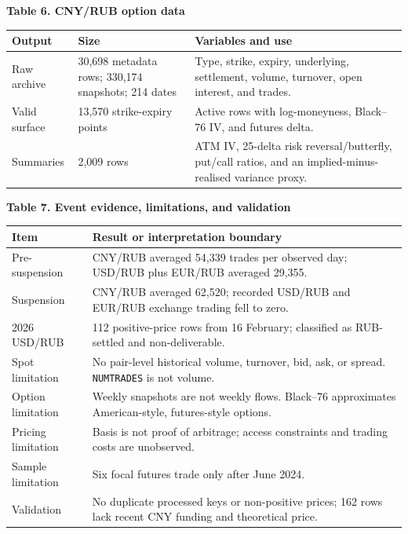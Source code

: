 \documentclass[11pt,a4paper]{article}
\begin{document}
\textbf{Table 6. CNY/RUB option data}

\begin{tabularx}{\textwidth}{@{}p{}p{}Y@{}}
\toprule
\textbf{Output} & \textbf{Size} & \textbf{Variables and use} \\
\midrule
Raw archive & 30,698 metadata rows; 330,174 snapshots; 214 dates & Type, strike, expiry, underlying, settlement, volume, turnover, open interest, and trades. \\
Valid surface & 13,570 strike-expiry points & Active rows with log-moneyness, Black--76 IV, and futures delta. \\
Summaries & 2,009 rows & ATM IV, 25-delta risk reversal/butterfly, put/call ratios, and an implied-minus-realised variance proxy. \\
\bottomrule
\end{tabularx}

\textbf{Table 7. Event evidence, limitations, and validation}

\begin{tabularx}{\textwidth}{@{}p{}Y@{}}
\toprule
\textbf{Item} & \textbf{Result or interpretation boundary} \\
\midrule
Pre-suspension & CNY/RUB averaged 54,339 trades per observed day; USD/RUB plus EUR/RUB averaged 29,355. \\
Suspension & CNY/RUB averaged 62,520; recorded USD/RUB and EUR/RUB exchange trading fell to zero. \\
2026 USD/RUB & 112 positive-price rows from 16 February; classified as RUB-settled and non-deliverable. \\
Spot limitation & No pair-level historical volume, turnover, bid, ask, or spread. \texttt{NUMTRADES} is not volume. \\
Option limitation & Weekly snapshots are not weekly flows. Black--76 approximates American-style, futures-style options. \\
Pricing limitation & Basis is not proof of arbitrage; access constraints and trading costs are unobserved. \\
Sample limitation & Six focal futures trade only after June 2024. \\
Validation & No duplicate processed keys or non-positive prices; 162 rows lack recent CNY funding and theoretical price. \\
\bottomrule
\end{tabularx}
\end{document}
